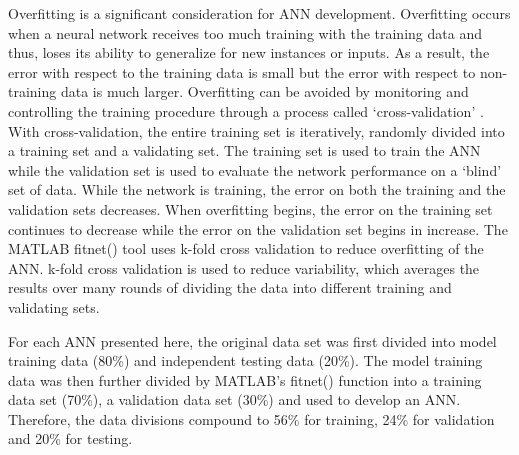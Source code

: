 Overfitting is a significant consideration for ANN development. Overfitting occurs when a neural network receives too much training with the training data and thus, loses its ability to generalize for new instances or inputs. As a result, the error with respect to the training data is small but the error with respect to non-training data is much larger. Overfitting can be avoided by monitoring and controlling the training procedure through a process called `cross-validation' \cite{Kohavi_1995}. With cross-validation, the entire training set is iteratively, randomly divided into a training set and a validating set. The training set is used to train the ANN while the validation set is used to evaluate the network performance on a `blind' set of data. While the network is training, the error on both the training and the validation sets decreases. When overfitting begins, the error on the training set continues to decrease while the error on the validation set begins in increase. The MATLAB fitnet() tool uses k-fold cross validation to reduce overfitting of the ANN. k-fold cross validation is used to reduce variability, which averages the results over many rounds of dividing the data into different training and validating sets. 

For each ANN presented here, the original data set was first divided into model training data (80\%) and independent testing data (20\%). The model training data was then further divided by MATLAB's fitnet() function into a training data set (70\%), a validation data set (30\%) and used to develop an ANN. Therefore, the data divisions compound to 56\% for training, 24\% for validation and 20\% for testing. 

